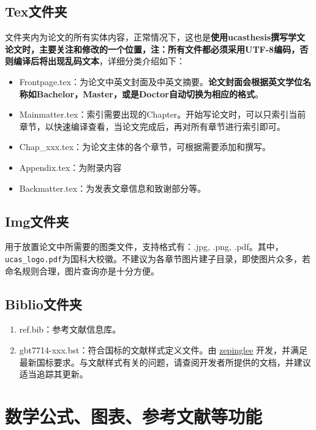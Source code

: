 \subsection{Tex文件夹}

文件夹内为论文的所有实体内容，正常情况下，这也是\textbf{使用ucasthesis撰写学文论文时，主要关注和修改的一个位置，注：所有文件都必须采用UTF-8编码，否则编译后将出现乱码文本}，详细分类介绍如下：

\begin{itemize}
    \item Frontpage.tex：为论文中英文封面及中英文摘要。\textbf{论文封面会根据英文学位名称如Bachelor，Master，或是Doctor自动切换为相应的格式}。
    \item Mainmatter.tex：索引需要出现的Chapter。开始写论文时，可以只索引当前章节，以快速编译查看，当论文完成后，再对所有章节进行索引即可。
    \item Chap{\_}xxx.tex：为论文主体的各个章节，可根据需要添加和撰写。
    \item Appendix.tex：为附录内容
    \item Backmatter.tex：为发表文章信息和致谢部分等。
\end{itemize}

\subsection{Img文件夹}

用于放置论文中所需要的图类文件，支持格式有：.jpg, .png, .pdf。其中，\verb|ucas_logo.pdf|为国科大校徽。不建议为各章节图片建子目录，即使图片众多，若命名规则合理，图片查询亦是十分方便。

\subsection{Biblio文件夹}

\begin{enumerate}
    \item ref.bib：参考文献信息库。
    \item gbt7714-xxx.bst：符合国标的文献样式定义文件。由 \href{https://github.com/zepinglee/gbt7714-bibtex-style}{zepinglee}  开发，并满足最新国标要求。与文献样式有关的问题，请查阅开发者所提供的文档，并建议适当追踪其更新。
\end{enumerate}

\section{数学公式、图表、参考文献等功能}

